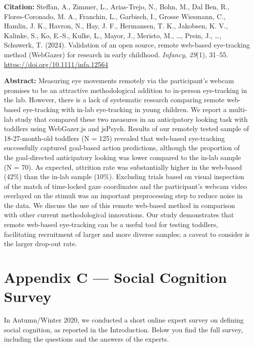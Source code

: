 \documentclass[
]{scrbook}
\begin{document}
\textbf{Citation:} Steffan, A., Zimmer, L., Arias-Trejo, N., Bohn, M., Dal Ben, R., Flores-Coronado, M. A., Franchin, L., Garbisch, I., Grosse Wiesmann, C., Hamlin, J. K., Havron, N., Hay, J. F., Hermansen, T. K., Jakobsen, K. V., Kalinke, S., Ko, E.-S., Kulke, L., Mayor, J., Meristo, M., \ldots, Prein, J., \ldots, Schuwerk, T. (2024). Validation of an open source, remote web-based eye-tracking method (WebGazer) for research in early childhood. \emph{Infancy, 29}(1), 31--55. \mbox{\url{https://doi.org/10.1111/infa.12564}}

\textbf{Abstract:} Measuring eye movements remotely via the participant's webcam promises to be an attractive methodological addition to in-person eye-tracking in the lab. However, there is a lack of systematic research comparing remote web-based eye-tracking with in-lab eye-tracking in young children. We report a multi-lab study that compared these two measures in an anticipatory looking task with toddlers using WebGazer.js and jsPsych. Results of our remotely tested sample of 18-27-month-old toddlers (N = 125) revealed that web-based eye-tracking successfully captured goal-based action predictions, although the proportion of the goal-directed anticipatory looking was lower compared to the in-lab sample (N = 70). As expected, attrition rate was substantially higher in the web-based (42\%) than the in-lab sample (10\%). Excluding trials based on visual inspection of the match of time-locked gaze coordinates and the participant's webcam video overlayed on the stimuli was an important preprocessing step to reduce noise in the data. We discuss the use of this remote web-based method in comparison with other current methodological innovations. Our study demonstrates that remote web-based eye-tracking can be a useful tool for testing toddlers, facilitating recruitment of larger and more diverse samples; a caveat to consider is the larger drop-out rate.

\chapter*{Appendix C --- Social Cognition Survey}\label{appendixC}

In Autumn/Winter 2020, we conducted a short online expert survey on defining social cognition, as reported in the Introduction. Below you find the full survey, including the questions and the answers of the experts.

\begin{minipage}{\textwidth}

\end{minipage}
\end{document}
